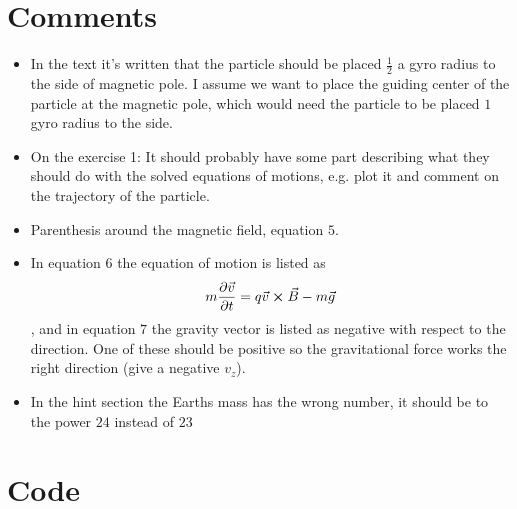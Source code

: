 \documentclass[x11names]{article}
\renewcommand{\va}{\vec}
\begin{document}
\section{Comments}
  \begin{itemize}
    \item In the text it's written that the particle should be placed \(\frac{1}{2}\) a gyro radius to the side of magnetic pole. I assume we want to place the guiding center of the particle at the magnetic pole, which would need the particle to be placed \(1\) gyro radius to the side.
    \item On the exercise 1: It should probably have some part describing what they should do with the solved equations of motions, e.g. plot it and comment on the trajectory of the particle.
    \item Parenthesis around the magnetic field, equation \(5\).
    \item In equation \(6\) the equation of motion is listed as 
    \[m\pdv{\va{v}}{t} = q\va{v} \cross \va{B} - m \va{g}\]
    , and in equation \(7\) the gravity vector is listed as negative with respect to the direction.
    One of these should be positive so the gravitational force works the right direction (give a negative \(v_z\)).
    \item In the hint section the Earths mass has the wrong number, it should be to the power \(24\) instead of \(23\)
  \end{itemize}

\section{Code}
  \label{sec:code}
  
\end{document}
